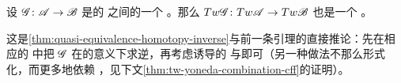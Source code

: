 \begin{lemma}\label{thm:tw-quasi-equivalence-preserved}
设 $\mathscr{G}\colon\mathscr{A}\to\mathscr{B}$ 是\trCunital{}的 \trACategory{}之间的一个%
\trQuasiequivalence。那么 $Tw\mathscr{G}\colon Tw\mathscr{A}\to Tw\mathscr{B}$ 也是一个%
\trQuasiequivalence。
\end{lemma}
这是\cref{thm:quasi-equivalence-homotopy-inverse}与前一条引理的直接推论：先在相应的%
\trFunctor\trCategory{}中把 $\mathscr{G}$ 在\trIsomorphism{}的意义下求逆，再考虑诱导的%
\trFunctor{}与\trNaturalTransformation{}即可（另一种做法不那么形式化，而更多地依赖%
\trExactTriangle，见下文\cref{thm:tw-yoneda-combination-cff}的证明）。
